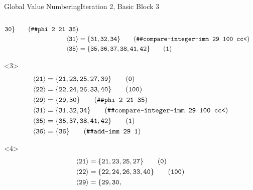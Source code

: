 \documentclass{beamer}
\newcommand{\vn}[1]{\ensuremath{\langle\texttt{#1}\rangle}}
\newcommand{\vreg}[1]{\texttt{#1}}
\begin{document}
\begin{frame}[fragile]{Global Value Numbering}{Iteration 2, Basic Block 3}
\begin{columns}[t,onlytextwidth]
\begin{column}{.5\textwidth}
\begin{onlyenv}
\begin{align*}
                       \vreg{30}\} \tag{\texttt{\#\#phi 2 21 35}} \\
          \vn{31} &= \{\vreg{31},
                       \vreg{32},
                       \vreg{34}\} \tag{\texttt{\#\#compare-integer-imm 29 100 cc<}} \\
          \vn{35} &= \{\vreg{35},
                       \vreg{36},
                       \vreg{37},
                       \vreg{38},
                       \vreg{41},
                       \vreg{42}\} \tag{\texttt{1}}
        \end{align*}
      \end{onlyenv}
      \begin{onlyenv}<3>
        \begin{align*}
          \vn{21} &= \{\vreg{21},
                       \vreg{23},
                       \vreg{25},
                       \vreg{27},
                       \vreg{39}\} \tag{\texttt{0}} \\
          \vn{22} &= \{\vreg{22},
                       \vreg{24},
                       \vreg{26},
                       \vreg{33},
                       \vreg{40}\} \tag{\texttt{100}} \\
          \vn{29} &= \{\vreg{29},
                       \vreg{30}\} \tag{\texttt{\#\#phi 2 21 35}} \\
          \vn{31} &= \{\vreg{31},
                       \vreg{32},
                       \vreg{34}\} \tag{\texttt{\#\#compare-integer-imm 29 100 cc<}} \\
          \vn{35} &= \{\vreg{35},
                       \vreg{37},
                       \vreg{38},
                       \vreg{41},
                       \vreg{42}\} \tag{\texttt{1}} \\
          \vn{36} &= \{\vreg{36}\} \tag{\texttt{\#\#add-imm 29 1}}
        \end{align*}
      \end{onlyenv}
      \begin{onlyenv}<4>
        \begin{align*}
          \vn{21} &= \{\vreg{21},
                       \vreg{23},
                       \vreg{25},
                       \vreg{27}\} \tag{\texttt{0}} \\
          \vn{22} &= \{\vreg{22},
                       \vreg{24},
                       \vreg{26},
                       \vreg{33},
                       \vreg{40}\} \tag{\texttt{100}} \\
          \vn{29} &= \{\vreg{29},
                       \vreg{30},

\end{align*}
\end{onlyenv}
\end{column}
\end{columns}
\end{frame}
\end{document}
